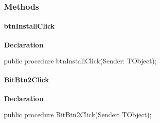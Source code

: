 \documentclass{report}
\newif\ifpdf
\begin{document}
\subsubsection*{\large{\textbf{Methods}}\normalsize\hspace{1ex}\hfill}
\paragraph*{btnInstallClick}\hspace*{\fill}

\label{manager.TmnFrm-btnInstallClick}
\begin{list}{}{
\setlength{\itemindent}{0cm}
\setlength{\listparindent}{0cm}
\setlength{\leftmargin}{\evensidemargin}
\addtolength{\leftmargin}{\tmplength}
\settowidth{\labelsep}{X}
\addtolength{\leftmargin}{\labelsep}
\setlength{\labelwidth}{\tmplength}
}
\item[\textbf{Declaration}\hfill]
\ifpdf
\begin{flushleft}
\fi
\begin{ttfamily}
public procedure btnInstallClick(Sender: TObject);\end{ttfamily}

\ifpdf
\end{flushleft}
\fi

\end{list}
\paragraph*{BitBtn2Click}\hspace*{\fill}

\label{manager.TmnFrm-BitBtn2Click}
\begin{list}{}{
\setlength{\itemindent}{0cm}
\setlength{\listparindent}{0cm}
\setlength{\leftmargin}{\evensidemargin}
\addtolength{\leftmargin}{\tmplength}
\settowidth{\labelsep}{X}
\addtolength{\leftmargin}{\labelsep}
\setlength{\labelwidth}{\tmplength}
}
\item[\textbf{Declaration}\hfill]
\ifpdf
\begin{flushleft}
\fi
\begin{ttfamily}
public procedure BitBtn2Click(Sender: TObject);\end{ttfamily}

\ifpdf
\end{flushleft}
\fi

\end{list}
\end{document}
